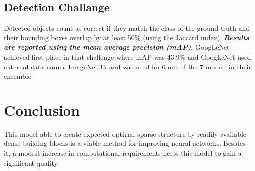 \documentclass[12pt]{article}
\begin{document}
\subsection{Detection Challange}
Detected objects count as correct if they match the class of the ground truth and
their bounding boxes overlap by at least 50\% (using the Jaccard index).
\newline
\textbf{\textit{Results are reported using the mean average precision (mAP).}}
\newline
GoogLeNet achieved first place in that challenge where mAP was 43.9\%  and GoogLeNet used external data named ImageNet 1k and was used for 6 out of the 7 models in their ensemble.


\section{Conclusion}
This model able to create expected optimal sparse structure by readily available dense building blocks is a viable method for improving neural networks. Besides it, a modest increase in computational requirements helps this model to gain a significant quality.



\end{document}
